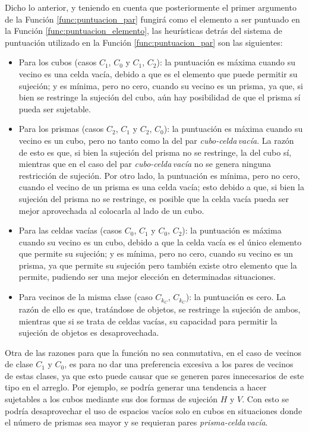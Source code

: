 Dicho lo anterior, y teniendo en cuenta que posteriormente el primer argumento de la Función \ref{func:puntuacion_par} fungirá como el elemento a ser puntuado en la Función \ref{func:puntuacion_elemento}, las heurísticas detrás del sistema de puntuación utilizado en la Función \ref{func:puntuacion_par} son las siguientes:
%
\begin{itemize}
	\item Para los cubos (casos $C_1$, $C_0$ y $C_1$, $C_2$): la puntuación es máxima cuando su vecino es una celda vacía, debido a que es el elemento que puede permitir su sujeción; y es mínima, pero no cero, cuando su vecino es un prisma, ya que, si bien se restringe la sujeción del cubo, aún hay posibilidad de que el prisma sí pueda ser sujetable.
	\item Para los prismas (casos $C_2$, $C_1$ y $C_2$, $C_0$): la puntuación es máxima cuando su vecino es un cubo, pero no tanto como la del par \textsl{cubo-celda\,vacía}.
	La razón de esto es que, si bien la sujeción del prisma no se restringe, la del cubo sí, mientras que en el caso del par \textsl{cubo-celda\,vacía} no se genera ninguna restricción de sujeción.
	Por otro lado, la puntuación es mínima, pero no cero, cuando el vecino de un prisma es una celda vacía; esto debido a que, si bien la sujeción del prisma no se restringe, es posible que la celda vacía pueda ser mejor aprovechada al colocarla al lado de un cubo.
	\item Para las celdas vacías (casos $C_0$, $C_1$ y $C_0$, $C_2$): la puntuación es máxima cuando su vecino es un cubo, debido a que la celda vacía es el único elemento que permite su sujeción; y es mínima, pero no cero, cuando su vecino es un prisma, ya que permite su sujeción pero también existe otro elemento que la permite, pudiendo ser una mejor elección en determinadas situaciones.
	\item Para vecinos de la misma clase (caso $C_{k_C}$, $C_{k_C}$): la puntuación es cero.
	 La razón de ello es que, tratándose de objetos, se restringe la sujeción de ambos, mientras que si se trata de celdas vacías, su capacidad para permitir la sujeción de objetos es desaprovechada.
\end{itemize}
%
Otra de las razones para que la función no sea conmutativa, en el caso de vecinos de clase $C_1$ y $C_0$, es para no dar una preferencia excesiva a los pares de vecinos de estas clases, ya que esto puede causar que se generen pares innecesarios de este tipo en el arreglo.
Por ejemplo, se podría generar una tendencia a hacer sujetables a los cubos mediante sus dos formas de sujeción $H$ y $V$.
Con esto se podría desaprovechar el uso de espacios vacíos solo en cubos en situaciones donde el número de prismas sea mayor y se requieran pares \textsl{prisma-celda\,vacía}.

